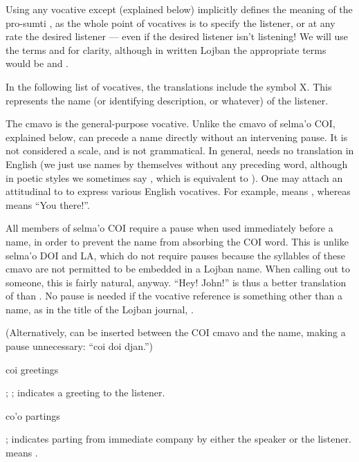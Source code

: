 Using any vocative except  (explained below)
    implicitly defines the meaning of the pro-sumti , as the
    whole point of vocatives is to specify the listener, or at any
    rate the desired listener --- even if the desired listener
    isn't listening! We will use the terms  and
     for clarity, although in written Lojban the
    appropriate terms would be  and .

In the following list of vocatives, the translations include
    the symbol X. This represents the name (or identifying
    description, or whatever) of the listener.

The cmavo  is the general-purpose vocative. Unlike
    the cmavo of selma'o COI, explained below,  can precede
    a name directly without an intervening pause. It is not
    considered a scale, and  is not grammatical. In
    general,  needs no translation in English (we just use
    names by themselves without any preceding word, although in
    poetic styles we sometimes say , which is equivalent to
    ). One may attach an attitudinal to  to express
    various English vocatives. For example,  means
    , whereas  means ``You
    there!''.

All members of selma'o COI require a pause when used
    immediately before a name, in order to prevent the name from
    absorbing the COI word. This is unlike selma'o DOI and LA,
    which do not require pauses because the syllables of these
    cmavo are not permitted to be embedded in a Lojban name. When
    calling out to someone, this is fairly natural, anyway. ``Hey!
    John!'' is thus a better translation of  than
    . No pause is needed if the vocative reference is
    something other than a name, as in the title of the Lojban
    journal, .

(Alternatively,  can be inserted between the COI
    cmavo and the name, making a pause unnecessary: ``coi doi
    djan.'')

   coi greetings

; ; indicates a greeting to the
    listener. 

   co'o    partings

; indicates parting from immediate company by
    either the speaker or the listener.  means
    . 

